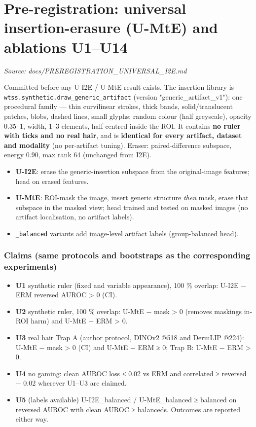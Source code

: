 \section{Pre-registration: universal insertion-erasure (U-MtE) and ablations U1–U14}\label{doc:PREREGISTRATION_UNIVERSAL_I2E}
\noindent\textit{Source: docs/PREREGISTRATION\_UNIVERSAL\_I2E.md}

{\small
Committed before any U-I2E / U-MtE result exists. The insertion library is \texttt{wtss.synthetic.draw\_generic\_artifact}
(version "generic\_artifact\_v1"): one procedural family --- thin curvilinear strokes, thick bands, solid/translucent
patches, blobs, dashed lines, small glyphs; random colour (half greyscale), opacity 0.35--1, width, 1--3 elements,
half centred inside the ROI. It contains \textbf{no ruler with ticks and no real hair}, and is \textbf{identical for every
artifact, dataset and modality} (no per-artifact tuning). Eraser: paired-difference subspace, energy 0.90,
max rank 64 (unchanged from I2E).

\begin{itemize}

\item
  \textbf{U-I2E}: erase the generic-insertion subspace from the original-image features; head on erased features.
\item
  \textbf{U-MtE}: ROI-mask the image, insert generic structure \emph{then} mask, erase that subspace in the masked view;
  head trained and tested on masked images (no artifact localisation, no artifact labels).
\item
  \texttt{\_balanced} variants add image-level artifact labels (group-balanced head).
\end{itemize}

\subsubsection{Claims (same protocols and bootstraps as the corresponding experiments)}\label{claims-same-protocols-and-bootstraps-as-the-corresponding-experiments}

\begin{itemize}

\item
  \textbf{U1} synthetic ruler (fixed and variable appearance), 100 \% overlap: U-I2E − ERM reversed AUROC \textgreater{} 0 (CI).
\item
  \textbf{U2} synthetic ruler, 100 \% overlap: U-MtE − mask \textgreater{} 0 (removes masking\textquotesingle s in-ROI harm) and U-MtE − ERM \textgreater{} 0.
\item
  \textbf{U3} real hair Trap A (author protocol, DINOv2 @518 and DermLIP @224): U-MtE − mask \textgreater{} 0 (CI) and
  U-MtE − ERM ≥ 0; Trap B: U-MtE − ERM \textgreater{} 0.
\item
  \textbf{U4} no gaming: clean AUROC loss ≤ 0.02 vs ERM and correlated ≥ reversed − 0.02 wherever U1--U3 are claimed.
\item
  \textbf{U5} (labels available) U-I2E\_balanced / U-MtE\_balanced ≥ balanced on reversed AUROC with clean AUROC ≥ balanced\textquotesingle s.
  Outcomes are reported either way.
\end{itemize}

}
